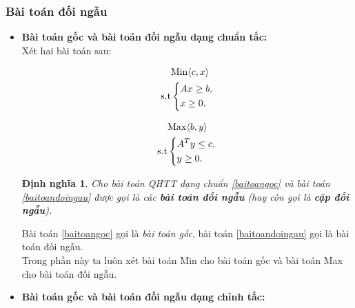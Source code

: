 \documentclass[12pt,a4paper]{report}
\newtheorem{dn}{Định nghĩa}[chapter]
\begin{document}
\subsubsection{ Bài toán đối ngẫu }
\begin{itemize}
    \item \textbf{Bài toán gốc và bài toán đối ngẫu dạng chuẩn tắc:}\\
    Xét hai bài toán sau:\\
    \begin{minipage}[t]{0.48\linewidth}
   \begin{equation}\label{baitoangoc}
     \begin{split}
          & {\rm{Min}} \langle c,x \rangle\\
          \rm{s.t} &\left\{\begin{split}
            & Ax\ge b,\\
            & x \ge 0.\\
           \end{split}\right.
       \end{split}
   \end{equation}
\end{minipage}\hfill
\begin{minipage}[t]{0.48\linewidth}
\begin{equation}\label{baitoandoingau}
    \begin{split}
        & {\rm{Max}} \langle b,y \rangle\\
       \rm{s.t} & \left\{\begin{split}
            &A^Ty \le c,\\
            & y\ge 0.\\
        \end{split}\right.
    \end{split}
\end{equation}
\end{minipage}
\begin{dn}
    Cho bài toán QHTT dạng chuẩn \eqref{baitoangoc} và bài toán \eqref{baitoandoingau} được gọi là các \textbf{bài toán đối ngẫu } (hay còn gọi là \textbf{cặp đối ngẫu}).\\
\end{dn}
Bài toán \eqref{baitoangoc} gọi là \textit{bài toán gốc}, bài toán \eqref{baitoandoingau} gọi là bài toán đối ngẫu.\\
Trong phần này ta luôn xét bài toán Min cho bài toán gốc và bài toán Max cho bài toán đối ngẫu.\\
  \item \textbf{Bài toán gốc và bài toán đối ngẫu dạng chỉnh tắc:}\\

\end{itemize}
\end{document}
